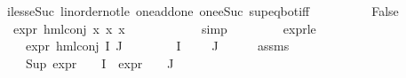 \begin{isabellebody}
iless{\isacharunderscore}{\kern0pt}eSuc{}\ linorder{\isacharunderscore}{\kern0pt}not{\isacharunderscore}{\kern0pt}le\ one{\isacharunderscore}{\kern0pt}add{\isacharunderscore}{\kern0pt}one\ one{\isacharunderscore}{\kern0pt}eSuc\ sup{\isacharunderscore}{\kern0pt}eq{\isacharunderscore}{\kern0pt}bot{\isacharunderscore}{\kern0pt}iff{\isacharparenright}{\kern0pt}\isanewline
\ \ \ \ \ \ \isamarkupfalse%
\ \isamarkupfalse%
\ False\ \isamarkupfalse%
\ {\isacartoucheopen}expr{\isacharunderscore}{\kern0pt}{}\ {\isacharparenleft}{\kern0pt}hml{\isacharunderscore}{\kern0pt}conj\ x{}{}\ x{}{}\ x{}{}{\isacharparenright}{\kern0pt}\ {\isasymle}\ {}{\isacartoucheclose}\isanewline
\ \ \ \ \ \ \ \ \isamarkupfalse%
\ simp\isanewline
\ \ \ \ \isamarkupfalse%
\isanewline
\ \ \isamarkupfalse%
\isanewline
{}\isamarkupfalse%
%
\endisatagproof
{\isafoldproof}%
%
\isadelimproof
\isanewline
%
\endisadelimproof
\isanewline
{}\isamarkupfalse%
\ expr{\isacharunderscore}{\kern0pt}{}{\isacharunderscore}{\kern0pt}le{\isacharunderscore}{\kern0pt}{}{\isacharcolon}{\kern0pt}\ \ \isanewline
\ \ \ {\isachardoublequoteopen}expr{\isacharunderscore}{\kern0pt}{}\ {\isacharparenleft}{\kern0pt}hml{\isacharunderscore}{\kern0pt}conj\ I\ J\ {\isasymPhi}{\isacharparenright}{\kern0pt}\ {\isasymle}\ {}{\isachardoublequoteclose}\isanewline
\ \ \ {\isachardoublequoteopen}{\isasymPhi}\ {\isacharbackquote}{\kern0pt}\ I\ {\isacharequal}{\kern0pt}\ {\isacharbraceleft}{\kern0pt}{\isacharbraceright}{\kern0pt}{\isachardoublequoteclose}\ {\isachardoublequoteopen}{\isasymPhi}\ {\isacharbackquote}{\kern0pt}\ J\ {\isacharequal}{\kern0pt}\ {\isacharbraceleft}{\kern0pt}{\isacharbraceright}{\kern0pt}{\isachardoublequoteclose}\isanewline
%
\isadelimproof
%
\endisadelimproof
%
\isatagproof
{}\isamarkupfalse%
{\isacharminus}{\kern0pt}\isanewline
\ \ \isamarkupfalse%
\ assms\ \isamarkupfalse%
\ {\isachardoublequoteopen}{}\ {\isacharplus}{\kern0pt}\ Sup\ {\isacharparenleft}{\kern0pt}{\isacharparenleft}{\kern0pt}expr{\isacharunderscore}{\kern0pt}{}\ {\isasymcirc}\ {\isasymPhi}{\isacharparenright}{\kern0pt}\ {\isacharbackquote}{\kern0pt}\ I\ {\isasymunion}\ {\isacharparenleft}{\kern0pt}expr{\isacharunderscore}{\kern0pt}{}\ {\isasymcirc}\ {\isasymPhi}{\isacharparenright}{\kern0pt}\ {\isacharbackquote}{\kern0pt}\ J{\isacharparenright}{\kern0pt}\ \ {\isasymle}\ {}{\isachardoublequoteclose}\isanewline

\end{isabellebody}
